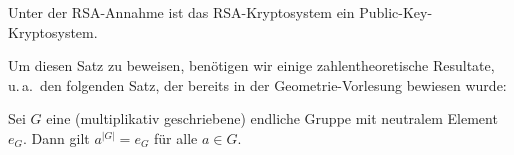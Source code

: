 \begin{theorem}\label{thm:rsa}
 Unter der RSA-Annahme ist das RSA-Kryptosystem ein Public-Key-Kryptosystem.
\end{theorem}

Um diesen Satz zu beweisen, benötigen wir einige zahlentheoretische Resultate, u.\,a.~den folgenden Satz, der bereits in der Geometrie-Vorlesung bewiesen wurde:

\begin{theorem}
 Sei $G$ eine (multiplikativ geschriebene) endliche Gruppe mit neutralem Element $e_G$. Dann gilt $a^{|G|} = e_G$ für alle $a \in G$.
\end{theorem}


